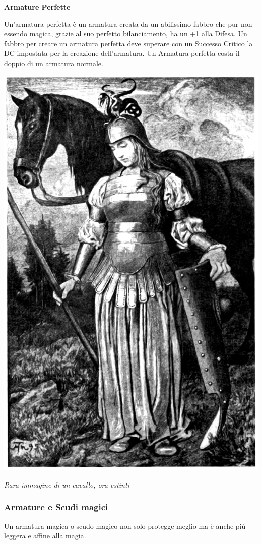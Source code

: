 \begin{multicols}{2}
\textbf{Armature Perfette}

Un'armatura perfetta è un armatura creata da un abilissimo fabbro che pur non essendo magica, grazie al suo perfetto bilanciamento, ha un +1 alla Difesa. Un fabbro per creare un armatura perfetta deve superare con un Successo Critico la DC impostata per la creazione dell'armatura. Un Armatura perfetta costa il doppio di un armatura normale.

\medskip

\begin{center}
	\includegraphics[width=0.75\linewidth]{immagini/donnacavalierecavallo.png}

	\emph{Rara immagine di un cavallo, ora estinti}
\end{center}

\subsubsection{Armature e Scudi magici}\label{armaturaescudimagici}\hypertarget{armaturaescudimagici}{}

Un armatura magica o scudo magico non solo protegge meglio ma è anche più leggera e affine alla magia.


\end{multicols}
